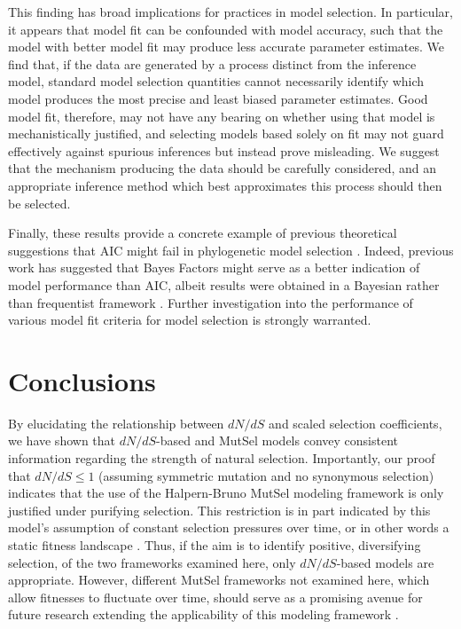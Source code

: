 \documentclass[11pt]{article}
\begin{document}
This finding has broad implications for practices in model selection. In particular, it appears that model fit can be confounded with model accuracy, such that the model with better model fit may produce less accurate parameter estimates. We find that, if the data are generated by a process distinct from the inference model, standard model selection quantities cannot necessarily identify which model produces the most precise and least biased parameter estimates. Good model fit, therefore, may not have any bearing on whether using that model is mechanistically justified, and selecting models based solely on fit may not guard effectively against spurious inferences but instead prove misleading. We suggest that the mechanism producing the data should be carefully considered, and an appropriate inference method which best approximates this process should then be selected. 

Finally, these results provide a concrete example of previous theoretical suggestions that AIC might fail in phylogenetic model selection \citep{Liberles2013}. Indeed, previous work has suggested that Bayes Factors might serve as a better indication of model performance than AIC, albeit results were obtained in a Bayesian rather than frequentist framework \citep{Rodrigue2008}. Further investigation into the performance of various model fit criteria for model selection is strongly warranted. 



\section*{Conclusions}
By elucidating the relationship between $dN/dS$ and scaled selection coefficients, we have shown that $dN/dS$-based and MutSel models convey consistent information regarding the strength of natural selection. Importantly, our proof that $dN/dS \leq 1$ (assuming symmetric mutation and no synonymous selection) indicates that the use of the Halpern-Bruno MutSel modeling framework is only justified under purifying selection. This restriction is in part indicated by this model's assumption of constant selection pressures over time, or in other words a static fitness landscape \citep{HalpernBruno1998,Thorneetal2007,Rodrigueetal2010,Thorne2012}. Thus, if the aim is to identify positive, diversifying selection, of the two frameworks examined here, only $dN/dS$-based models are appropriate. However, different MutSel frameworks not examined here, which allow fitnesses to fluctuate over time, should serve as a promising avenue for future research extending the applicability of this modeling framework \citep{Whelan2008,MustonenLassig2009}.
\end{document}
